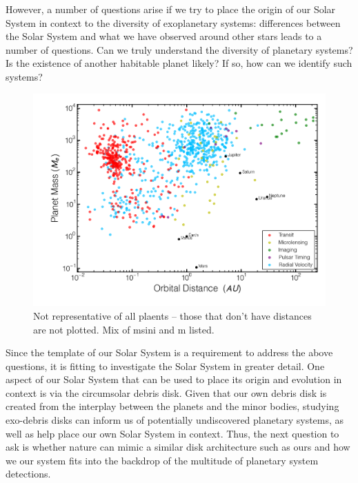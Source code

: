     
    However, a number of questions arise if we try to place the origin of our Solar System in context to the diversity of exoplanetary systems:  differences between the Solar System and what we have observed around other stars leads to a number of questions. Can we truly understand the diversity of planetary systems? Is the existence of another habitable planet likely? If so, how can we identify such systems?
    \begin{figure}
    \centering
    \includegraphics[scale=0.6]{Ch1/exoplanet_detections_june2015} 
    \caption[Exoplanet Statistics]{Not representative of all plaents -- those that don't have distances are not plotted. Mix of msini and m listed.}
    \label{fig:known_exoplanets}
    \end{figure}
    
    Since the template of our Solar System is a requirement to address the above questions, it is fitting to investigate the Solar System in greater detail. One aspect of our Solar System that can be used to place its origin and evolution in context is via the circumsolar debris disk. Given that our own debris disk is created from the interplay between the planets and the minor bodies, studying exo-debris disks can inform us of potentially undiscovered planetary systems, as well as help place our own Solar System in context. Thus, the next question to ask is whether nature can mimic a similar disk architecture such as ours and how we our system fits into the backdrop of the multitude of planetary system detections. 
    
